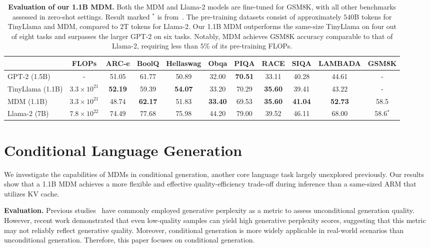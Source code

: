 \documentclass{article} %
\begin{document}
\begin{table}[t!]
    \centering
    \caption{\textbf{Evaluation of our 1.1B MDM.} Both the MDM and Llama-2 models are fine-tuned for GSM8K, with all other benchmarks assessed in zero-shot settings. Result marked $^*$ is from~\cite{gong2024scaling}. The pre-training datasets consist of approximately $540$B tokens for TinyLlama and MDM, compared to $2$T tokens for Llama-2. Our 1.1B MDM outperforms the same-size TinyLlama on four out of eight tasks and surpasses the larger GPT-2 on six tasks. Notably, MDM achieves GSM8K accuracy comparable to that of Llama-2, requiring less than $5\%$ of its pre-training FLOPs.}
    \label{tab:compare_mdm_gpt2}
    \begin{adjustbox}{max width=\textwidth}
    \begin{tabular}{lcccccccccc}
      \toprule
         & FLOPs & ARC-e & BoolQ & Hellaswag &  Obqa &  PIQA & RACE & SIQA  & LAMBADA & GSM8K\\
        \midrule
       GPT-2 (1.5B) & -& 51.05 & 61.77 & 50.89 & 32.00 & \textbf{70.51} & 33.11 & 40.28 & 44.61 &-\\
       TinyLlama (1.1B) & $3.3 \times 10^{21}$ & \textbf{52.19} & 59.39 & \textbf{54.07} & 33.20 & 70.29 & \textbf{35.60} & 39.41 & 43.22 &-\\
        MDM (1.1B) &$3.3 \times 10^{21}$ & 48.74 & \textbf{62.17} & 51.83 & \textbf{33.40} & 69.53 & \textbf{35.60} & \textbf{41.04} & \textbf{52.73} & 58.5\\
        \midrule
        Llama-2 (7B) & $7.8 \times 10^{22}$ & 74.49 & 77.68 &75.98& 44.20 & 79.00 & 39.52 & 46.11 &68.00 & 58.6$^*$ \\
      \bottomrule
    \end{tabular}
    \end{adjustbox}
\end{table}

\section{Conditional Language Generation}
\label{sec:conditional_generation}

We investigate the capabilities of MDMs in conditional generation, another core language task largely unexplored previously. Our results show that a 1.1B MDM achieves a more flexible and effective quality-efficiency trade-off during inference than a same-sized ARM that utilizes KV cache.

\textbf{Evaluation.} Previous studies~\citep{lou2023discrete, sahoo2024simple, shi2024simplified, ou2024your, gat2024discrete} have commonly employed generative perplexity as a metric to assess unconditional generation quality. However, recent work \citep{zheng2024masked} demonstrated that even low-quality samples can yield high generative perplexity scores, suggesting that this metric may not reliably reflect generative quality. Moreover, conditional generation is more widely applicable in real-world scenarios than unconditional generation. Therefore, this paper focuses on conditional generation.
\end{document}
